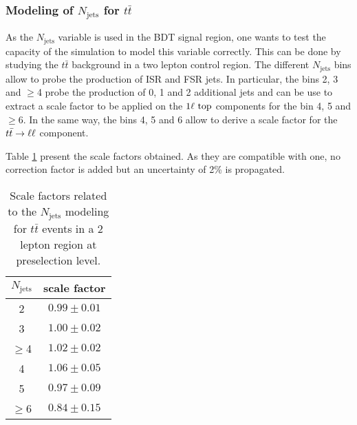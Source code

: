             \subsubsection{Modeling of $N_\text{jets}$ for $t\bar{t}$}

            As the $N_\text{jets}$ variable is used in the BDT signal region, one wants to test the
            capacity of the simulation to model this variable correctly. This can be done by
            studying the $t\bar{t}$ background in a two lepton control region. The different
            $N_\text{jets}$ bins allow to probe the production of ISR and FSR jets. In particular,
            the bins 2, 3 and $\geq$4 probe the production of 0, 1 and 2 additional jets and
            can be use to extract a scale factor to be applied on the $1\ell~\text{top}$ components
            for the bin 4, 5 and $\geq$6. In the same way, the bins 4, 5 and 6 allow to derive
            a scale factor for the $t\bar{t} \rightarrow \ell \ell$ component. 
            
            Table \ref{tab:NjetsModeling} present the scale factors obtained. As they are compatible
            with one, no correction factor is added but an uncertainty of 2\% is propagated.

            \begin{table}
                \centering
                \begin{tabular}{|c|c|}
                    \hline
                   $N_\text{jets}$ & scale factor \\
                    \hline
                    2              & $0.99 \pm 0.01$ \\
                    3              & $1.00 \pm 0.02$ \\
                    $\geq$4        & $1.02 \pm 0.02$ \\
                    \hline          
                    4              & $1.06 \pm 0.05$ \\
                    5              & $0.97 \pm 0.09$ \\
                    $\geq$6        & $0.84 \pm 0.15$ \\
                    \hline
                \end{tabular}
                \caption{Scale factors related to the $N_\text{jets}$ modeling for $t\bar{t}$ events in a 2 lepton region at preselection level.}
                \label{tab:NjetsModeling}
            \end{table}

